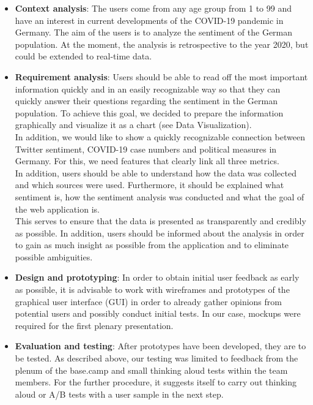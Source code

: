 \documentclass[
    fontsize=12pt,
    headings=small,
    parskip=half,           %
    bibliography=totoc,
    numbers=noenddot,       %
    open=any,               %
    ]{scrreprt}
\begin{document}
\begin{itemize}
    \item \textbf{Context analysis}: The users come from any age group from 1 to 99 and have an interest in current developments of the COVID-19 pandemic in Germany. The aim of the users is to analyze the sentiment of the German population. At the moment, the analysis is retrospective to the year 2020, but could be extended to real-time data.
    \item  
    \textbf{Requirement analysis}: Users should be able to read off the most important information quickly and in an easily recognizable way so that they can quickly answer their questions regarding the sentiment in the German population. To achieve this goal, we decided to prepare the information graphically and visualize it as a chart (see Data Visualization). \\
    In addition, we would like to show a quickly recognizable connection between Twitter sentiment, COVID-19 case numbers and political measures in Germany. For this, we need features that clearly link all three metrics. \\
    In addition, users should be able to understand how the data was collected and which sources were used. Furthermore, it should be explained what sentiment is, how the sentiment analysis was conducted and what the goal of the web application is. \\
    This serves to ensure that the data is presented as transparently and credibly as possible. In addition, users should be informed about the analysis in order to gain as much insight as possible from the application and to eliminate possible ambiguities. 

    \item \textbf{Design and prototyping}: In order to obtain initial user feedback as early as possible, it is advisable to work with wireframes and prototypes of the graphical user interface (GUI) in order to already gather opinions from potential users and possibly conduct initial tests. In our case, mockups were required for the first plenary presentation.
    
    \item \textbf{Evaluation and testing}: After prototypes have been developed, they are to be tested. As described above, our testing was limited to feedback from the plenum of the base.camp and small thinking aloud tests within the team members. For the further procedure, it suggests itself to carry out thinking aloud or A/B tests with a user sample in the next step.
    
    
\end{itemize}
\end{document}
